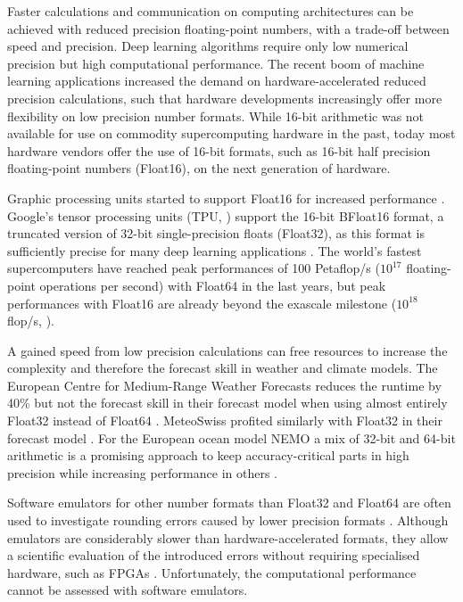 Faster calculations and communication on computing architectures can be achieved
with reduced precision floating-point numbers, with a trade-off between speed
and precision. Deep learning algorithms require only low numerical precision but
high computational performance. The recent boom of machine learning applications
increased the demand on hardware-accelerated reduced precision calculations,
such that hardware developments increasingly offer more flexibility on
low precision number formats. While 16-bit arithmetic was not available for use
on commodity supercomputing hardware in the past, today most hardware vendors
offer the use of 16-bit formats, such as 16-bit half precision floating-point
numbers (Float16), on the next generation of hardware.

Graphic processing units started to support Float16 for increased performance
\citep{Markidis2018}. Google's tensor processing units (TPU, \citep{Jouppi2017,Jouppi2018})
support the 16-bit BFloat16 format, a truncated version of 32-bit single-precision
floats (Float32), as this format is sufficiently precise for many deep learning
applications \citep{Kalamkar2019,Burgess2019,Gupta2015}. The world's fastest
supercomputers have reached peak performances of 100 Petaflop/s ($10^{17}$
floating-point operations per second) with Float64 in the last years, but peak
performances with Float16 are already beyond the exascale milestone
($10^{18}$ flop/s, \cite{Kurth2018}).

A gained speed from low precision calculations can free resources
to increase the complexity and therefore the forecast skill in weather and climate models.
The European Centre for Medium-Range Weather Forecasts reduces the runtime by
40\% but not the forecast skill in their forecast model when using almost entirely
Float32 instead of Float64 \citep{Vana2017}. MeteoSwiss
profited similarly with Float32 in their forecast model \citep{Rudisuhli2013}. For
the European ocean model NEMO a mix of 32-bit and 64-bit arithmetic is a promising
approach to keep accuracy-critical parts in high precision while increasing
performance in others \citep{TintoPrims2019}.

Software emulators for other number formats than Float32 and Float64 are often
used to investigate rounding errors caused by lower precision formats \citep{Dawson2017}.
Although emulators are considerably slower than hardware-accelerated formats,
they allow a scientific evaluation of the introduced errors without requiring
specialised hardware, such as FPGAs \citep{Russell2017}. Unfortunately, the
computational performance cannot be assessed with software emulators.

